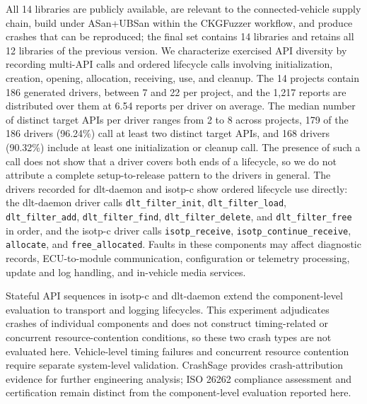 \documentclass[pdflatex,sn-basic]{sn-jnl}%
\theoremstyle{thmstyleone}%
\theoremstyle{thmstyletwo}%
\theoremstyle{thmstylethree}%
\begin{document}
{\color{blue}
All 14 libraries are publicly available, are relevant to the connected-vehicle supply chain, build under ASan+UBSan within the CKGFuzzer workflow, and produce crashes that can be reproduced; the final set contains 14 libraries and retains all 12 libraries of the previous version. We characterize exercised API diversity by recording multi-API calls and ordered lifecycle calls involving initialization, creation, opening, allocation, receiving, use, and cleanup. The 14 projects contain 186 generated drivers, between 7 and 22 per project, and the 1,217 reports are distributed over them at 6.54 reports per driver on average. The median number of distinct target APIs per driver ranges from 2 to 8 across projects, 179 of the 186 drivers (96.24\%) call at least two distinct target APIs, and 168 drivers (90.32\%) include at least one initialization or cleanup call. The presence of such a call does not show that a driver covers both ends of a lifecycle, so we do not attribute a complete setup-to-release pattern to the drivers in general. The drivers recorded for dlt-daemon and isotp-c show ordered lifecycle use directly: the dlt-daemon driver calls \texttt{dlt\_filter\_init}, \texttt{dlt\_filter\_load}, \texttt{dlt\_filter\_add}, \texttt{dlt\_filter\_find}, \texttt{dlt\_filter\_delete}, and \texttt{dlt\_filter\_free} in order, and the isotp-c driver calls \texttt{isotp\_receive}, \texttt{isotp\_continue\_receive}, \texttt{allocate}, and \texttt{free\_allocated}. Faults in these components may affect diagnostic records, ECU-to-module communication, configuration or telemetry processing, update and log handling, and in-vehicle media services.
}

{\color{blue}
Stateful API sequences in isotp-c and dlt-daemon extend the component-level evaluation to transport and logging lifecycles. This experiment adjudicates crashes of individual components and does not construct timing-related or concurrent resource-contention conditions, so these two crash types are not evaluated here. Vehicle-level timing failures and concurrent resource contention require separate system-level validation. CrashSage provides crash-attribution evidence for further engineering analysis; ISO 26262 compliance assessment and certification remain distinct from the component-level evaluation reported here.
}
\end{document}
